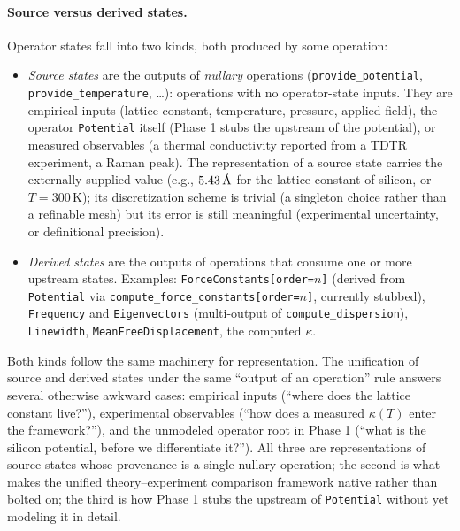 \documentclass[11pt,a4paper]{article}
\begin{document}
\paragraph{Source versus derived states.} Operator states fall into two kinds, both
produced by some operation:
\begin{itemize}[leftmargin=2em]
  \item \emph{Source states} are the outputs of \emph{nullary} operations
        (\texttt{provide\_potential}, \texttt{provide\_temperature}, \ldots): operations
        with no operator-state inputs. They are empirical inputs (lattice constant,
        temperature, pressure, applied field), the operator \texttt{Potential} itself
        (Phase 1 stubs the upstream of the potential), or measured observables (a
        thermal conductivity reported from a TDTR experiment, a Raman peak). The
        representation of a source state carries the externally supplied value (e.g.,
        $5.43\,\textup{\AA}$ for the lattice constant of silicon, or $T = 300\,\text{K}$);
        its discretization scheme is trivial (a singleton choice rather than a refinable
        mesh) but its error is still meaningful (experimental uncertainty, or
        definitional precision).
  \item \emph{Derived states} are the outputs of operations that consume one or more
        upstream states. Examples: \texttt{ForceConstants[order=$n$]} (derived from
        \texttt{Potential} via \texttt{compute\_force\_constants[order=$n$]}, currently
        stubbed), \texttt{Frequency} and \texttt{Eigenvectors} (multi-output of
        \texttt{compute\_dispersion}), \texttt{Linewidth},
        \texttt{MeanFreeDisplacement}, the computed $\kappa$.
\end{itemize}
Both kinds follow the same machinery for representation. The unification of source and
derived states under the same ``output of an operation'' rule answers several otherwise
awkward cases: empirical inputs (``where does the lattice constant live?''), experimental
observables (``how does a measured $\kappa(T)$ enter the framework?''), and the unmodeled
operator root in Phase 1 (``what is the silicon potential, before we differentiate
it?''). All three are representations of source states whose provenance is a single
nullary operation; the second is what makes the unified theory--experiment comparison
framework native rather than bolted on; the third is how Phase 1 stubs the upstream of
\texttt{Potential} without yet modeling it in detail.
\end{document}
